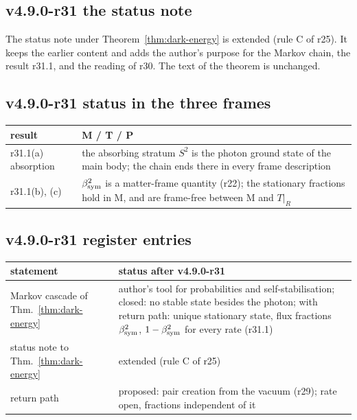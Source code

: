 \subsection*{v4.9.0-r31 the status note}
\label{subsec:v490-r31-note}

The status note under Theorem~\ref{thm:dark-energy} is extended (rule C of r25).  It keeps the earlier content and adds the author's
purpose for the Markov chain, the result r31.1, and the reading of r30.  The text of the theorem is unchanged.

\subsection*{v4.9.0-r31 status in the three frames}
\label{subsec:v490-r31-frames}

\begin{center}
\small
\begin{tabular}{@{}>{\raggedright\arraybackslash}p{}>{\raggedright\arraybackslash}p{}@{}}
\toprule
result & M / T / P\\
\midrule
r31.1(a) absorption & the absorbing stratum \(S^2\) is the photon ground state of the main body; the chain ends there in every frame description\\
r31.1(b), (c) & \(\beta_{\mathrm{sym}}^2\) is a matter-frame quantity (r22); the stationary fractions hold in M, and are frame-free between M and \(T|_R\)\\
\bottomrule
\end{tabular}
\end{center}

\subsection*{v4.9.0-r31 register entries}
\label{subsec:v490-r31-register}

\begin{center}
\small
\begin{tabular}{@{}>{\raggedright\arraybackslash}p{}>{\raggedright\arraybackslash}p{}@{}}
\toprule
statement & status after v4.9.0-r31\\
\midrule
Markov cascade of Thm.~\ref{thm:dark-energy} & author's tool for probabilities and self-stabilisation; closed: no stable state besides the photon; with return path: unique stationary state, flux fractions \(\beta_{\mathrm{sym}}^2\), \(1-\beta_{\mathrm{sym}}^2\) for every rate (r31.1)\\
status note to Thm.~\ref{thm:dark-energy} & extended (rule C of r25)\\
return path & proposed: pair creation from the vacuum (r29); rate open, fractions independent of it\\
\bottomrule
\end{tabular}
\end{center}

